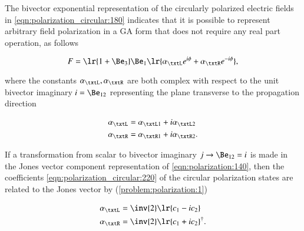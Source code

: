 The bivector exponential representation of the circularly polarized electric fields in \cref{eqn:polarization_circular:180} indicates that it is possible to represent arbitrary field polarization in a GA form that does not require any real part operation, as follows

\begin{dmath}\label{eqn:polarization_circular:200}
F = \lr{ 1 + \Be_3 } \Be_1 \lr{ \alpha_\txtL e^{i\phi} + \alpha_\txtR e^{-i\phi} },
\end{dmath}

where the constants \( \alpha_\txtL, \alpha_\txtR \) are both complex with respect to the unit bivector imaginary \( i = \Be_{12} \) representing the plane transverse to the propagation direction

\begin{dmath}\label{eqn:polarization_circular:220}
\begin{aligned}
\alpha_\txtL &= \alpha_{\txtL 1} + i \alpha_{\txtL 2} \\
\alpha_\txtR &= \alpha_{\txtR 1} + i \alpha_{\txtR 2}.
\end{aligned}
\end{dmath}

If a transformation from scalar to bivector imaginary \( j \rightarrow \Be_{12} = i \) is made in the Jones vector component representation of \cref{eqn:polarization:140},
then
the coefficients \cref{eqn:polarization_circular:220} of the circular polarization states are related to the Jones vector by (\cref{problem:polarization:1})

\begin{dmath}\label{eqn:polarization_circular:260}
\begin{aligned}
\alpha_\txtL &= \inv{2}\lr{ c_1 - i c_2 } \\
\alpha_\txtR &= \inv{2}\lr{ c_1 + i c_2 }^\dagger.
\end{aligned}
\end{dmath}

